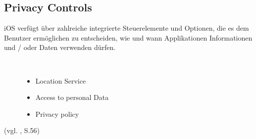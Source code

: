 \subsection{Privacy Controls}
\label{sec:PrivacyControls}
iOS verfügt über zahlreiche integrierte Steuerelemente und Optionen, die
es dem Benutzer ermöglichen zu entscheiden, wie und wann Applikationen
Informationen und / oder Daten verwenden dürfen. 
\begin{description}
    \item[\parbox{\textwidth} {Dies sind die Mainfeature von Apples
\glqq Privacy Controll\grqq{} Service} ]~\par
    \begin{itemize}
        \item Location Service
        \item Access to personal Data
        \item Privacy policy
    \end{itemize}
\end{description}
(vgl. \cite{Apple[4]}, S.56)